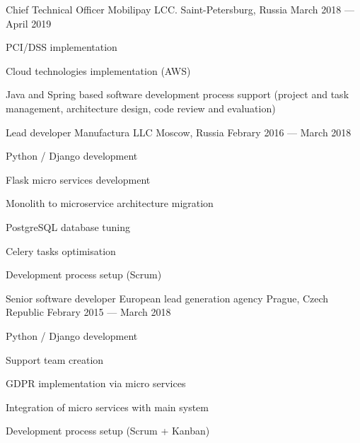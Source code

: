 \begin{cventries}
  \cventry
    {Chief Technical Officer} %
    {Mobilipay LCC.} %
    {Saint-Petersburg, Russia} %
    {March 2018 --- April 2019} %
    {
      \begin{cvitems} %
        \item {PCI/DSS implementation}
        \item {Cloud technologies implementation (AWS)}
        \item {Java and Spring based software development process support
(project and task management, architecture design, code review and evaluation)}
      \end{cvitems}
    }

  \cventry
    {Lead developer} %
    {Manufactura LLC} %
    {Moscow, Russia} %
    {Febrary 2016 --- March 2018} %
    {
      \begin{cvitems} %
        \item {Python / Django development}
        \item {Flask micro services development}
        \item {Monolith to microservice architecture migration}
        \item {PostgreSQL database tuning}
        \item {Celery tasks optimisation}
        \item {Development process setup (Scrum)}
      \end{cvitems}
    }

  \cventry
    {Senior software developer} %
    {European lead generation agency} %
    {Prague, Czech Republic} %
    {Febrary 2015 --- March 2018} %
    {
      \begin{cvitems}
        \item {Python / Django development}
        \item {Support team creation}
        \item {GDPR implementation via micro services}
        \item {Integration of micro services with main system}
        \item {Development process setup (Scrum + Kanban)}
      \end{cvitems}
    }


\end{cventries}
